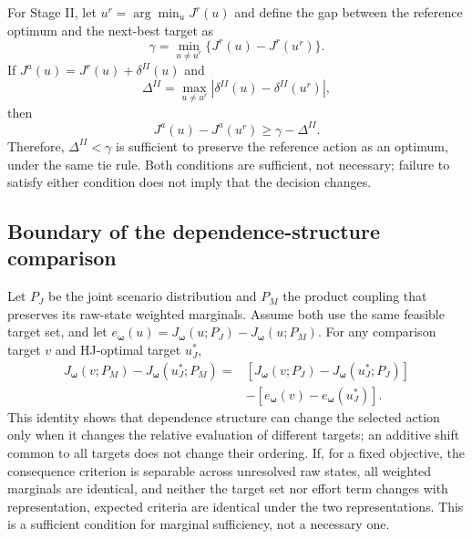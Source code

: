 \documentclass[10pt,a4paper]{article}
\numberwithin{equation}{section}
\begin{document}
For Stage II, let $u^r=\arg\min_u J^r(u)$ and define the gap between the reference optimum and the next-best target as
\begin{equation}
\gamma=\min_{u\ne u^r}\{J^r(u)-J^r(u^r)\}.
\end{equation}
If $J^a(u)=J^r(u)+\delta^{II}(u)$ and
\begin{equation}
\Delta^{II}=\max_{u\ne u^r}|\delta^{II}(u)-\delta^{II}(u^r)|,
\end{equation}
then
\begin{equation}
J^a(u)-J^a(u^r)\geq\gamma-\Delta^{II}.
\end{equation}
Therefore, $\Delta^{II}<\gamma$ is sufficient to preserve the reference action as an optimum, under the same tie rule. Both conditions are sufficient, not necessary; failure to satisfy either condition does not imply that the decision changes.

\subsection{Boundary of the dependence-structure comparison}
Let $P_J$ be the joint scenario distribution and $P_M$ the product coupling that preserves its raw-state weighted marginals. Assume both use the same feasible target set, and let $e_{\boldsymbol\omega}(u)=J_{\boldsymbol\omega}(u;P_J)-J_{\boldsymbol\omega}(u;P_M)$. For any comparison target $v$ and HJ-optimal target $u_J^*$,
\begin{equation}
\begin{aligned}
J_{\boldsymbol\omega}(v;P_M)-J_{\boldsymbol\omega}(u_J^*;P_M)
={}&[J_{\boldsymbol\omega}(v;P_J)-J_{\boldsymbol\omega}(u_J^*;P_J)]\\
&-[e_{\boldsymbol\omega}(v)-e_{\boldsymbol\omega}(u_J^*)].
\end{aligned}
\label{eq:dependence-identity}
\end{equation}
This identity shows that dependence structure can change the selected action only when it changes the relative evaluation of different targets; an additive shift common to all targets does not change their ordering. If, for a fixed objective, the consequence criterion is separable across unresolved raw states, all weighted marginals are identical, and neither the target set nor effort term changes with representation, expected criteria are identical under the two representations. This is a sufficient condition for marginal sufficiency, not a necessary one.
\end{document}
